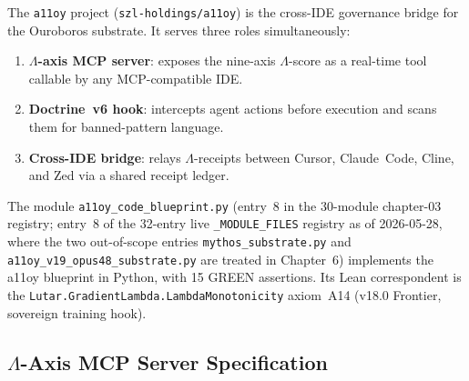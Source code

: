 The \texttt{a11oy} project (\texttt{szl-holdings/a11oy}) is the
cross-IDE governance bridge for the Ouroboros substrate.  It serves three
roles simultaneously:

\begin{enumerate}
  \item \textbf{\(\Lambda\)-axis MCP server}: exposes the nine-axis
    \(\Lambda\)-score as a real-time tool callable by any MCP-compatible IDE.
  \item \textbf{Doctrine~v6 hook}: intercepts agent actions before execution
    and scans them for banned-pattern language.
  \item \textbf{Cross-IDE bridge}: relays \(\Lambda\)-receipts between Cursor,
    Claude~Code, Cline, and Zed via a shared receipt ledger.
\end{enumerate}

The module \texttt{a11oy\_code\_blueprint.py} (entry~8 in the 30-module
chapter-03 registry; entry~8 of the 32-entry live \texttt{\_MODULE\_FILES}
registry as of 2026-05-28, where the two out-of-scope entries
\texttt{mythos\_substrate.py} and \texttt{a11oy\_v19\_opus48\_substrate.py}
are treated in Chapter~6) implements the a11oy blueprint in Python, with 15
GREEN assertions.
Its Lean correspondent is the \texttt{Lutar.GradientLambda.LambdaMonotonicity}
axiom~A14 (v18.0 Frontier, sovereign training hook).

\subsection{\(\Lambda\)-Axis MCP Server Specification}
\label{ssec:a11oy-mcp}

